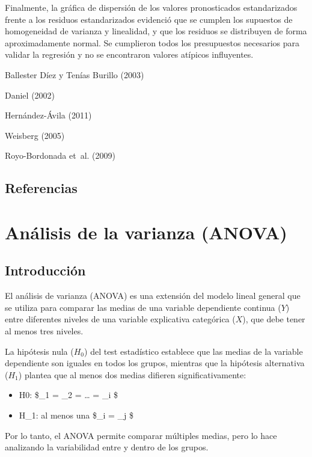 \documentclass[
  spanish,
  a4paper,
]{scrbook}
\begin{document}
Finalmente, la gráfica de dispersión de los valores pronosticados
estandarizados frente a los residuos estandarizados evidenció que se
cumplen los supuestos de homogeneidad de varianza y linealidad, y que
los residuos se distribuyen de forma aproximadamente normal. Se
cumplieron todos los presupuestos necesarios para validar la regresión y
no se encontraron valores atípicos influyentes.

Ballester Díez y Tenías Burillo (2003)

Daniel (2002)

Hernández-Ávila (2011)

Weisberg (2005)

Royo-Bordonada et~al. (2009)

\section*{Referencias}\label{referencias-14}


\chapter{Análisis de la varianza
(ANOVA)}\label{anuxe1lisis-de-la-varianza-anova}

\section{Introducción}\label{introducciuxf3n-14}

El análisis de varianza (ANOVA) es una extensión del modelo lineal
general que se utiliza para comparar las medias de una variable
dependiente continua (\(Y\)) entre diferentes niveles de una variable
explicativa categórica (\(X\)), que debe tener al menos tres niveles.

La hipótesis nula (\(H_0\)) del test estadístico establece que las
medias de la variable dependiente son iguales en todos los grupos,
mientras que la hipótesis alternativa (\(H_1\)) plantea que al menos dos
medias difieren significativamente:

\begin{itemize}
\item
  H0: \$\mu\_1 = \mu\_2 = \ldots{} = \mu\_i \$
\item
  H\_1: al menos una \$\mu\_i \not= \mu\_j \$
\end{itemize}

Por lo tanto, el ANOVA permite comparar múltiples medias, pero lo hace
analizando la variabilidad entre y dentro de los grupos.
\end{document}
